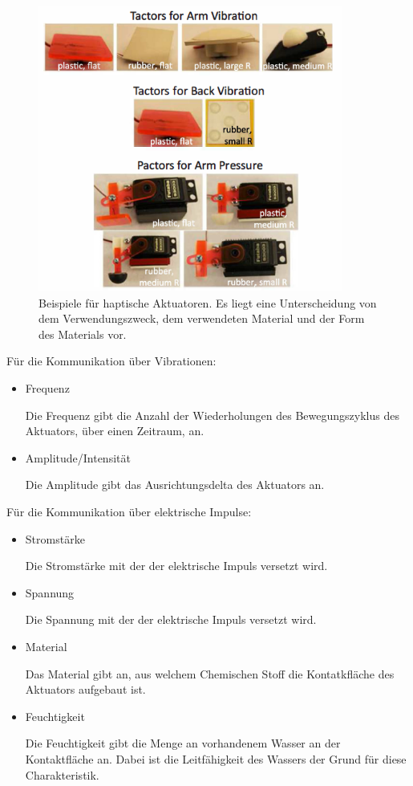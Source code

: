 \documentclass{llncs}					%
\begin{document}
\begin{figure}[htbp]
	\begin{center}
		\includegraphics[width = 10cm]{Grafiken/3-Haptische-Aktuatoren.png}
		\caption{Beispiele für haptische Aktuatoren\cite{6183832}. Es liegt eine Unterscheidung von dem Verwendungszweck, dem verwendeten Material und der Form des Materials vor.}
		\label{3-Haptische-Aktuatoren}
	\end{center}
\end{figure}

Für die Kommunikation über Vibrationen\cite{doi:10.1518/001872008X250638}:
\begin{itemize}
	\item Frequenz
	
	Die Frequenz gibt die Anzahl der Wiederholungen des Bewegungszyklus des Aktuators, über einen Zeitraum, an.
	
	\item Amplitude/Intensität %
	
	Die Amplitude gibt das Ausrichtungsdelta des Aktuators an.
\end{itemize}

Für die Kommunikation über elektrische Impulse\cite[S.~4]{68204}:
\begin{itemize}
	\item Stromstärke
	
	Die Stromstärke mit der der elektrische Impuls versetzt wird.
	
	\item Spannung
	
	Die Spannung mit der der elektrische Impuls versetzt wird.
	\item Material
	
	Das Material gibt an, aus welchem Chemischen Stoff die Kontatkfläche des Aktuators aufgebaut ist.
	\item Feuchtigkeit
	
	Die Feuchtigkeit gibt die Menge an vorhandenem Wasser an der Kontaktfläche an. Dabei ist die Leitfähigkeit des Wassers der Grund für diese Charakteristik.
\end{itemize}
\end{document}
